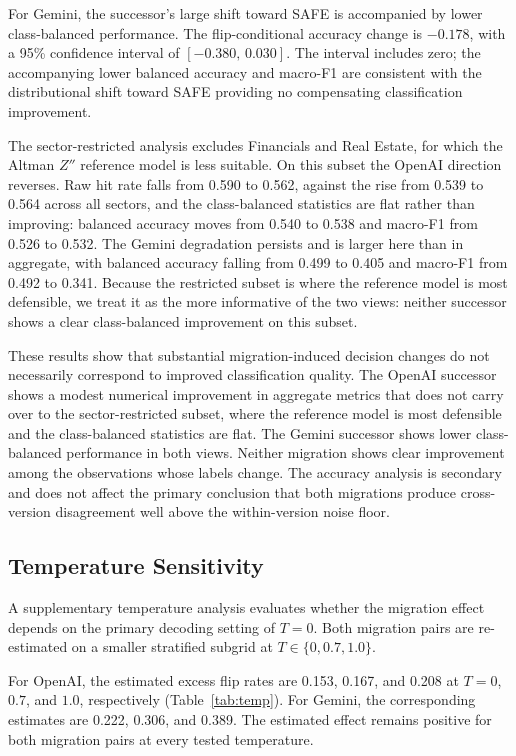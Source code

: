 \documentclass{ieeeaccess}
\begin{document}
For Gemini, the successor's large shift toward SAFE is accompanied by lower class-balanced performance. The flip-conditional accuracy change is $-0.178$, with a 95\% confidence interval of $[-0.380,\,0.030]$. The interval includes zero; the accompanying lower balanced accuracy and macro-F1 are consistent with the distributional shift toward SAFE providing no compensating classification improvement.

The sector-restricted analysis excludes Financials and Real Estate, for which the Altman $Z''$ reference model is less suitable. On this subset the OpenAI direction reverses. Raw hit rate falls from 0.590 to 0.562, against the rise from 0.539 to 0.564 across all sectors, and the class-balanced statistics are flat rather than improving: balanced accuracy moves from 0.540 to 0.538 and macro-F1 from 0.526 to 0.532. The Gemini degradation persists and is larger here than in aggregate, with balanced accuracy falling from 0.499 to 0.405 and macro-F1 from 0.492 to 0.341. Because the restricted subset is where the reference model is most defensible, we treat it as the more informative of the two views: neither successor shows a clear class-balanced improvement on this subset.

These results show that substantial migration-induced decision changes do not necessarily correspond to improved classification quality. The OpenAI successor shows a modest numerical improvement in aggregate metrics that does not carry over to the sector-restricted subset, where the reference model is most defensible and the class-balanced statistics are flat. The Gemini successor shows lower class-balanced performance in both views. Neither migration shows clear improvement among the observations whose labels change. The accuracy analysis is secondary and does not affect the primary conclusion that both migrations produce cross-version disagreement well above the within-version noise floor.

\subsection{Temperature Sensitivity}
A supplementary temperature analysis evaluates whether the migration effect depends on the primary decoding setting of $T=0$. Both migration pairs are re-estimated on a smaller stratified subgrid at $T\in\{0,0.7,1.0\}$.

For OpenAI, the estimated excess flip rates are 0.153, 0.167, and 0.208 at $T=0$, $0.7$, and $1.0$, respectively (Table~\ref{tab:temp}). For Gemini, the corresponding estimates are 0.222, 0.306, and 0.389. The estimated effect remains positive for both migration pairs at every tested temperature.
\end{document}
